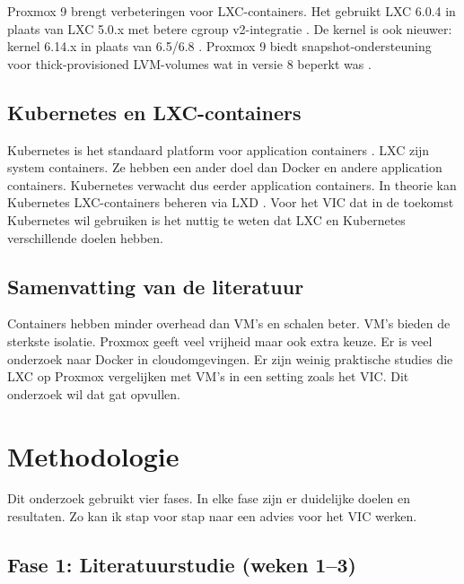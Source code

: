 Proxmox 9 brengt verbeteringen voor LXC-containers. Het gebruikt LXC 6.0.4 in plaats van LXC 5.0.x met betere cgroup v2-integratie \autocite{Xtom2025}. De kernel is ook nieuwer: kernel 6.14.x in plaats van 6.5/6.8 \autocite{UnixHost2025}. Proxmox 9 biedt snapshot-ondersteuning voor thick-provisioned LVM-volumes wat in versie 8 beperkt was \autocite{Proxmox2025, Saturnme2025}.

\subsection{Kubernetes en LXC-containers}

Kubernetes is het standaard platform voor application containers \autocite{IEEE2014Containers}. LXC zijn system containers. Ze hebben een ander doel dan Docker en andere application containers. Kubernetes verwacht dus eerder application containers. In theorie kan Kubernetes LXC-containers beheren via LXD \autocite{StackOverflow2020}. Voor het VIC dat in de toekomst Kubernetes wil gebruiken is het nuttig te weten dat LXC en Kubernetes verschillende doelen hebben.

\subsection{Samenvatting van de literatuur}

Containers hebben minder overhead dan VM's en schalen beter. VM's bieden de sterkste isolatie. Proxmox geeft veel vrijheid maar ook extra keuze. Er is veel onderzoek naar Docker in cloudomgevingen. Er zijn weinig praktische studies die LXC op Proxmox vergelijken met VM's in een setting zoals het VIC. Dit onderzoek wil dat gat opvullen.




\section{Methodologie}%
\label{sec:methodologie}

Dit onderzoek gebruikt vier fases. In elke fase zijn er duidelijke doelen en resultaten. Zo kan ik stap voor stap naar een advies voor het VIC werken.

\subsection{Fase 1: Literatuurstudie (weken 1–3)}

